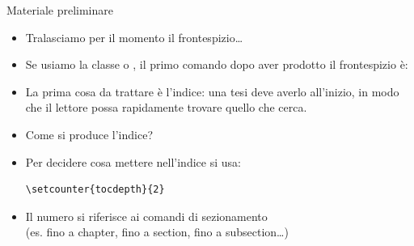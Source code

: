 \documentclass{beamer}
\begin{document}
\begin{frame}[fragile]{Materiale preliminare}

\begin{itemize}
\item Tralasciamo per il momento il frontespizio\ldots
\item Se usiamo la classe  o , il primo comando dopo aver prodotto il frontespizio \`e:
\begin{center}
\Large{}
\end{center}
\item La prima cosa da trattare \`e l'indice: una tesi deve averlo all'inizio, in modo che il lettore possa rapidamente trovare quello che cerca.
\item Come si produce l'indice?
\begin{center}
\Large{}
\end{center}
\item Per decidere cosa mettere nell'indice si usa:
\begin{verbatim}
\setcounter{tocdepth}{2}
\end{verbatim}
\item Il numero si riferisce ai comandi di sezionamento\\(es.  fino a chapter,  fino a section,  fino a subsection\ldots)

\end{itemize}


\end{frame}
\end{document}
